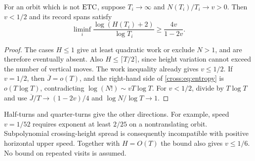 \begin{corollary}\label{cross:cor:speed}
For an orbit which is not $\mathrm{ETC}$, suppose $T_i\to\infty$ and
$N(T_i)/T_i\to v>0$. Then $v<1/2$ and its record spans satisfy
\[
 \liminf_i\frac{\log(H(T_i)+2)}{\log T_i}\ge\frac{4v}{1-2v}.
\]
\end{corollary}
\begin{proof}
The cases $H\le1$ give at least quadratic work or exclude $N>1$, and are
therefore eventually absent. Also $H\le\lceil T/2\rceil$, since height
variation cannot exceed the number of vertical moves. The work inequality
already gives $v\le1/2$. If $v=1/2$, then $\overline J=o(T)$, and the
right-hand side of \eqref{cross:eq:entropy} is $o(T\log T)$, contradicting
$\log(N!)\sim vT\log T$. For $v<1/2$, divide by $T\log T$ and use
$\overline J/T\to(1-2v)/4$ and $\log N/\log T\to1$.
\end{proof}
Half-turns and quarter-turns give the other directions. For example, speed
$v=1/52$ requires exponent at least $2/25$ on a nontranslating orbit.
Subpolynomial crossing-height spread is consequently incompatible with
positive horizontal upper speed. Together with $H=O(T)$ the bound also gives
$v\le1/6$. No bound on repeated visits is assumed.

